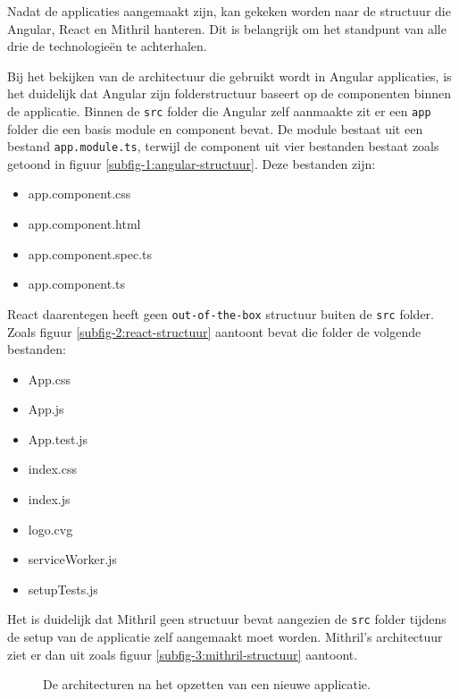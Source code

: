 Nadat de applicaties aangemaakt zijn, kan gekeken worden naar de structuur die Angular, React en Mithril hanteren. Dit is belangrijk om het standpunt van alle drie de technologieën te achterhalen.

Bij het bekijken van de architectuur die gebruikt wordt in Angular applicaties, is het duidelijk dat Angular zijn folderstructuur baseert op de componenten binnen de applicatie. Binnen de \texttt{src} folder die Angular zelf aanmaakte zit er een \texttt{app} folder die een basis module en component bevat. De module bestaat uit een bestand \texttt{app.module.ts}, terwijl de component uit vier bestanden bestaat zoals getoond in figuur \ref{subfig-1:angular-structuur}. Deze bestanden zijn:
\begin{itemize}
    \item app.component.css
    \item app.component.html
    \item app.component.spec.ts
    \item app.component.ts
\end{itemize}

React daarentegen heeft geen \texttt{out-of-the-box} structuur buiten de \texttt{src} folder. Zoals figuur \ref{subfig-2:react-structuur} aantoont bevat die folder de volgende bestanden:
\begin{itemize}
    \item App.css
    \item App.js
    \item App.test.js
    \item index.css
    \item index.js
    \item logo.cvg
    \item serviceWorker.js
    \item setupTests.js
\end{itemize}

Het is duidelijk dat Mithril geen structuur bevat aangezien de \texttt{src} folder tijdens de setup van de applicatie zelf aangemaakt moet worden. Mithril's architectuur ziet er dan uit zoals figuur \ref{subfig-3:mithril-structuur} aantoont.

\begin{figure}[!ht]
    \hfill
    \hfill
    \caption{De architecturen na het opzetten van een nieuwe applicatie.}
    \label{fig:structuren}
\end{figure}

